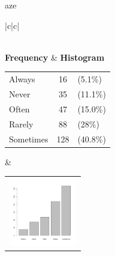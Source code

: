  aze 
  \begin{center}
    \addtolength{\leftskip}{-4cm}\addtolength{\rightskip}{-4cm}
    \begin{tabular}{|c|c|}

      \hline
        \\
      \hline
        {\bf Frequency} & {\bf Histogram}  \\
          \begin{tabular}{@{}l@{ : }cl@{}}
            Always & 16 &(5.1\%) \\
            Never & 35 &(11.1\%) \\
            Often & 47 &(15.0\%) \\
            Rarely & 88 &(28\%) \\
            Sometimes & 128 &(40.8\%) \\
          \end{tabular}
      &
          \begin{tabular}{@{}l@{}}
            \includegraphics[width=3cm]{graphUniv/V9-barplot}
          \end{tabular}
      \\ \hline 

    \end{tabular}
  \end{center}
  
  



